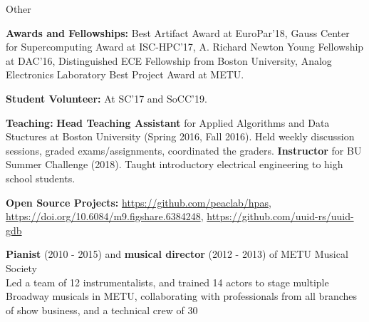 \documentclass{resume}
\begin{document}
\begin{rSection}{Other} \itemsep -3pt
\item {\bf Awards and Fellowships:} Best Artifact Award at EuroPar'18, Gauss
  Center for Supercomputing Award at ISC-HPC'17, A. Richard Newton Young
  Fellowship at DAC'16, Distinguished ECE Fellowship from Boston University,
  Analog Electronics Laboratory Best Project Award at METU.
\item {\bf Student Volunteer:} At SC'17 and SoCC'19.
\item {\bf Teaching:} {\bf Head Teaching Assistant} for Applied Algorithms and Data
  Stuctures at Boston University (Spring 2016, Fall 2016). Held weekly
  discussion sessions, graded exams/assignments, coordinated the graders. {\bf
    Instructor} for BU Summer Challenge (2018). Taught introductory electrical
  engineering to high school students.
\item {\bf Open Source Projects:} \url{https://github.com/peaclab/hpas},
  \url{https://doi.org/10.6084/m9.figshare.6384248},
  \url{https://github.com/uuid-rs/uuid-gdb}
\item {\bf Pianist} (2010 - 2015) and {\bf musical director} (2012 - 2013) of
  METU Musical Society \\
  Led a team of 12 instrumentalists, and trained 14 actors to stage multiple
  Broadway musicals in METU, collaborating with professionals from all branches
  of show business, and a technical crew of 30

\end{rSection}
\end{document}
